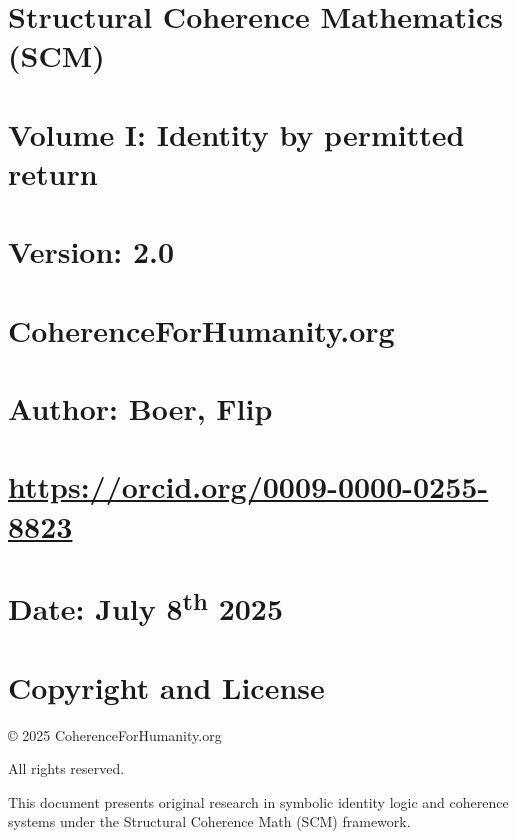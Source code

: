 \section{Structural Coherence Mathematics
(SCM)}\label{structural-coherence-mathematics-scm}

\section{Volume I: Identity by permitted
return}\label{volume-i-identity-by-permitted-return}

\section{Version: 2.0}\label{version-2.0}

\section{CoherenceForHumanity.org}\label{coherenceforhumanity.org}

\section{Author: Boer, Flip}\label{author-boer-flip}

\section{\texorpdfstring{\url{https://orcid.org/0009-0000-0255-8823}}{https://orcid.org/0009-0000-0255-8823}}\label{httpsorcid.org0009-0000-0255-8823}

\section{\texorpdfstring{Date: July 8\textsuperscript{th}
2025}{Date: July 8th 2025}}\label{date-july-8th-2025}

\section{Copyright and License}\label{copyright-and-license}

© 2025 CoherenceForHumanity.org

All rights reserved.

This document presents original research in symbolic identity logic and
coherence systems under the Structural Coherence Math (SCM) framework.

